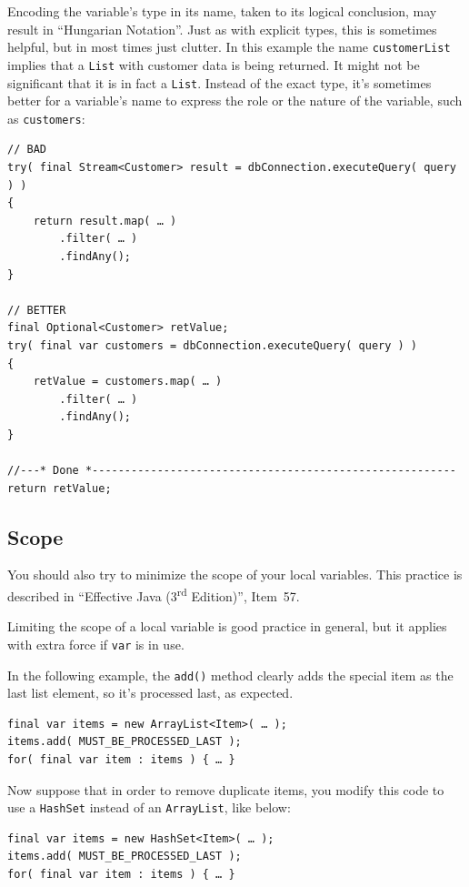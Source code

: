 \documentclass[11pt,a4paper, titlepage, parskip=half, headsepline, footsepline, cleardoublepage=current, headheight=1cm]{scrbook}
\begin{document}
Encoding the variable's type in its name, taken to its logical conclusion, may result in “Hungarian Notation”\autocite{WIKIPEDIA:Hungarian_notation,Jack:HungarianNotation}. Just as with explicit types, this is sometimes helpful, but in most times just clutter. In this example the name \lstinline|customerList| implies that a \lstinline|List| with customer data is being returned. It might not be significant that it is in fact a \lstinline|List|. Instead of the exact type, it’s sometimes better for a variable’s name to express the role or the nature of the variable, such as \lstinline|customers|:

\begin{lstlisting}
// BAD
try( final Stream<Customer> result = dbConnection.executeQuery( query ) ) 
{
    return result.map( … )
        .filter( … )
        .findAny();
}

// BETTER
final Optional<Customer> retValue;
try( final var customers = dbConnection.executeQuery( query ) ) 
{
    retValue = customers.map( … )
        .filter( … )
        .findAny();
}

//---* Done *--------------------------------------------------------
return retValue;
\end{lstlisting}


\subsection{Scope}\label{sec:varScope}
You should also try to minimize the scope of your local variables. This practice is described in “Effective Java (3\textsuperscript{rd} Edition)”\autocite{Bloch:EffectiveJava}, Item~57.

Limiting the scope of a local variable is good practice in general, but it applies with extra force if \lstinline|var| is in use.

In the following example, the \lstinline|add()| method clearly adds the special item as the last list element, so it’s processed last, as expected.
\begin{lstlisting}
final var items = new ArrayList<Item>( … );
items.add( MUST_BE_PROCESSED_LAST );
for( final var item : items ) { … }
\end{lstlisting}

Now suppose that in order to remove duplicate items, you modify this code to use a \lstinline|HashSet|\autocite{ORACLE_DOC_HASHSET_CLASS} instead of an \lstinline|ArrayList|\autocite{ORACLE_DOC_ARRAYLIST_CLASS}, like below:
\begin{lstlisting}
final var items = new HashSet<Item>( … );
items.add( MUST_BE_PROCESSED_LAST );
for( final var item : items ) { … }
\end{lstlisting}
\end{document}
